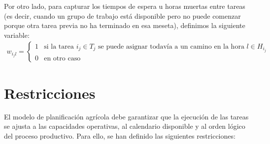 Por otro lado, para capturar los tiempos de espera u horas muertas entre tareas
(es decir, cuando un grupo de trabajo está disponible pero no puede comenzar porque otra tarea previa no ha terminado en esa meseta), definimos la siguiente variable:
\[\begin{aligned}
    w_{i_j l} = \begin{cases} 1 & \text{si la tarea } i_j \in T_j \text{ se puede asignar todavía a un camino en la hora } l \in H_{i_j} \\ 0 & \text{en otro caso} \end{cases}
\end{aligned}\] 


\section*{Restricciones}
El modelo de planificación agrícola debe garantizar que la ejecución de las tareas se ajusta a las capacidades operativas,
al calendario disponible y al orden lógico del proceso productivo. Para ello, se han definido las siguientes restricciones:
